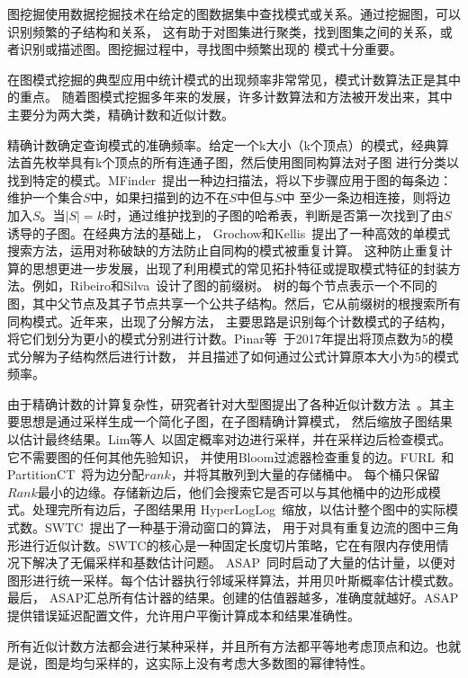 \documentclass[master]{thesis-uestc}
\begin{document}
    图挖掘使用数据挖掘技术在给定的图数据集中查找模式或关系。通过挖掘图，可以识别频繁的子结构和关系，
这有助于对图集进行聚类，找到图集之间的关系，或者识别或描述图。图挖掘过程中，寻找图中频繁出现的
模式十分重要。

    在图模式挖掘的典型应用中统计模式的出现频率非常常见，模式计数算法正是其中的重点。
随着图模式挖掘多年来的发展，许多计数算法和方法被开发出来，其中主要分为两大类，精确计数和近似计数。

    精确计数确定查询模式的准确频率。给定一个k大小（k个顶点）的模式，经典算法首先枚举具有k个顶点的所有连通子图，然后使用图同构算法对子图
进行分类以找到特定的模式。MFinder~\cite{Motifs}提出一种边扫描法，将以下步骤应用于图的每条边：维护一个集合$S$中，如果扫描到的边不在$S$中但与$S$中
至少一条边相连接，则将边加入$S$。当$|S|=k$时，通过维护找到的子图的哈希表，判断是否第一次找到了由$S$诱导的子图。在经典方法的基础上，
Grochow和Kellis~\cite{MotifUseSymmetryBreaking}提出了一种高效的单模式搜索方法，运用对称破缺的方法防止自同构的模式被重复计算。
这种防止重复计算的思想更进一步发展，出现了利用模式的常见拓扑特征或提取模式特征的封装方法。例如，Ribeiro和Silva~\cite{GTries}设计了图的前缀树。
树的每个节点表示一个不同的图，其中父节点及其子节点共享一个公共子结构。然后，它从前缀树的根搜索所有同构模式。近年来，出现了分解方法，
主要思路是识别每个计数模式的子结构，将它们划分为更小的模式分别进行计数。Pinar等~\cite{ESCAPE}于2017年提出将顶点数为5的模式分解为子结构然后进行计数，
并且描述了如何通过公式计算原本大小为5的模式频率。

    由于精确计数的计算复杂性，研究者针对大型图提出了各种近似计数方法~\cite{SampleInBigGraph}。其主要思想是通过采样生成一个简化子图，在子图精确计算模式，
然后缩放子图结果以估计最终结果。Lim等人~\cite{MemoryEfficient}以固定概率对边进行采样，并在采样边后检查模式。它不需要图的任何其他先验知识，
并使用Bloom过滤器检查重复的边。FURL~\cite{FURL}和PartitionCT~\cite{PartitionCT}将为边分配$rank$，并将其散列到大量的存储桶中。
每个桶只保留$Rank$最小的边缘。存储新边后，他们会搜索它是否可以与其他桶中的边形成模式。处理完所有边后，子图结果用
HyperLogLog~\cite{HyperLogLog}缩放，以估计整个图中的实际模式数。SWTC~\cite{SlidingWindow}提出了一种基于滑动窗口的算法，
用于对具有重复边流的图中三角形进行近似计数。SWTC的核心是一种固定长度切片策略，它在有限内存使用情况下解决了无偏采样和基数估计问题。
ASAP~\cite{ASAP}同时启动了大量的估计量，以便对图形进行统一采样。每个估计器执行邻域采样算法，并用贝叶斯概率估计模式数。最后，
ASAP汇总所有估计器的结果。创建的估值器越多，准确度就越好。ASAP提供错误延迟配置文件，允许用户平衡计算成本和结果准确性。

    所有近似计数方法都会进行某种采样，并且所有方法都平等地考虑顶点和边。也就是说，图是均匀采样的，这实际上没有考虑大多数图的幂律特性。
\end{document}
